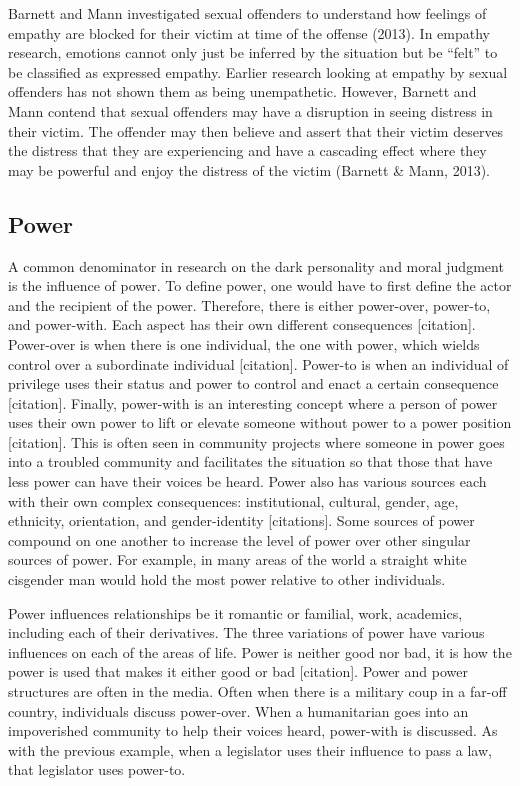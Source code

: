 \documentclass[
  english,
  donotrepeattitle,doc, 12pt, a4paper,floatsintext]{apa7}
\begin{document}
Barnett and Mann investigated sexual offenders to understand how feelings of empathy are blocked for their victim at time of the offense (2013). In empathy research, emotions cannot only just be inferred by the situation but be ``felt'' to be classified as expressed empathy. Earlier research looking at empathy by sexual offenders has not shown them as being unempathetic. However, Barnett and Mann contend that sexual offenders may have a disruption in seeing distress in their victim. The offender may then believe and assert that their victim deserves the distress that they are experiencing and have a cascading effect where they may be powerful and enjoy the distress of the victim (Barnett \& Mann, 2013).

\hypertarget{power}{%
\subsection{Power}\label{power}}

A common denominator in research on the dark personality and moral judgment is the influence of power. To define power, one would have to first define the actor and the recipient of the power. Therefore, there is either power-over, power-to, and power-with. Each aspect has their own different consequences {[}citation{]}. Power-over is when there is one individual, the one with power, which wields control over a subordinate individual {[}citation{]}. Power-to is when an individual of privilege uses their status and power to control and enact a certain consequence {[}citation{]}. Finally, power-with is an interesting concept where a person of power uses their own power to lift or elevate someone without power to a power position {[}citation{]}. This is often seen in community projects where someone in power goes into a troubled community and facilitates the situation so that those that have less power can have their voices be heard. Power also has various sources each with their own complex consequences: institutional, cultural, gender, age, ethnicity, orientation, and gender-identity {[}citations{]}. Some sources of power compound on one another to increase the level of power over other singular sources of power. For example, in many areas of the world a straight white cisgender man would hold the most power relative to other individuals.

Power influences relationships be it romantic or familial, work, academics, including each of their derivatives. The three variations of power have various influences on each of the areas of life. Power is neither good nor bad, it is how the power is used that makes it either good or bad {[}citation{]}. Power and power structures are often in the media. Often when there is a military coup in a far-off country, individuals discuss power-over. When a humanitarian goes into an impoverished community to help their voices heard, power-with is discussed. As with the previous example, when a legislator uses their influence to pass a law, that legislator uses power-to.
\end{document}
